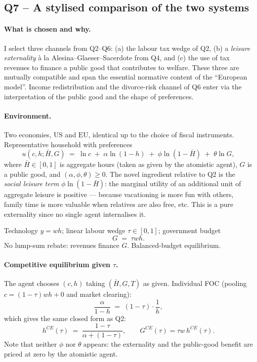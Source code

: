 \documentclass[11pt,a4paper]{article}
\begin{document}
\subsection*{Q7 -- A stylised comparison of the two systems}

\paragraph{What is chosen and why.}
I select three channels from Q2--Q6: (a) the labour tax wedge of Q2, (b) a \emph{leisure externality} à la Alesina--Glaeser--Sacerdote from Q4, and (c) the use of tax revenues to finance a public good that contributes to welfare. These three are mutually compatible and span the essential normative content of the ``European model''. Income redistribution and the divorce-risk channel of Q6 enter via the interpretation of the public good and the shape of preferences.

\paragraph{Environment.}
Two economies, $\text{US}$ and $\text{EU}$, identical up to the choice of fiscal instruments. Representative household with preferences
\begin{equation}
u(c,h;\bar H, G)\;=\;\ln c\;+\;\alpha\ln(1-h)\;+\;\phi\ln(1-\bar H)\;+\;\theta\ln G,
\label{eq:q7_util}
\end{equation}
where $\bar H\in[0,1]$ is aggregate hours (taken as given by the atomistic agent), $G$ is a public good, and $(\alpha,\phi,\theta)\ge 0$. The novel ingredient relative to Q2 is the \emph{social leisure term} $\phi\ln(1-\bar H)$: the marginal utility of an additional unit of aggregate leisure is positive --- because vacationing is more fun with others, family time is more valuable when relatives are also free, etc. This is a pure externality since no single agent internalises it.

Technology $y=wh$; linear labour wedge $\tau\in[0,1]$; government budget
\begin{equation}
G\;=\;\tau w h.
\label{eq:q7_gbc}
\end{equation}
No lump-sum rebate: revenues finance $G$. Balanced-budget equilibrium.

\paragraph{Competitive equilibrium given $\tau$.}
The agent chooses $(c,h)$ taking $(\bar H, G, T)$ as given. Individual FOC (pooling $c = (1-\tau) w h + 0$ and market clearing):
\begin{equation}
\frac{\alpha}{1-h}\;=\;(1-\tau)\cdot\frac{1}{h},
\label{eq:q7_foc}
\end{equation}
which gives the same closed form as Q2:
\begin{equation}
h^{CE}(\tau)\;=\;\frac{1-\tau}{\alpha+(1-\tau)},\qquad G^{CE}(\tau)=\tau w\,h^{CE}(\tau).
\label{eq:q7_hCE}
\end{equation}
Note that neither $\phi$ nor $\theta$ appears: the externality and the public-good benefit are priced at zero by the atomistic agent.
\end{document}
